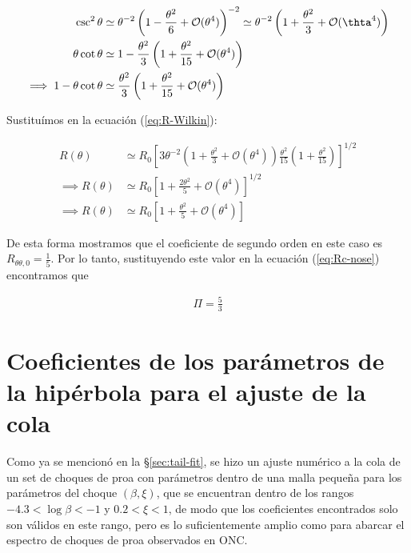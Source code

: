 \begin{align}
  \csc^2\theta &\simeq \theta^{-2}\left(1 - \frac{\theta^2}{6} + \mathcal{O}(\theta^4)\right)^{-2} \simeq
                 \theta^{-2}\left(1 + \frac{\theta^2}{3} + \mathcal{O}(\thta^4)\right) \\
  \theta\cot\theta &\simeq 1 - \frac{\theta^2}{3}\left(1 + \frac{\theta^2}{15} + \mathcal{O}(\theta^4)\right) \\
  \implies 1 -\theta\cot\theta &\simeq \frac{\theta^2}{3}\left(1 + \frac{\theta^2}{15} + \mathcal{O}(\theta^4)\right)
\end{align}

Sustituímos en la ecuación (\ref{eq:R-Wilkin}):

\begin{align}
  R(\theta) &\simeq R_0\left[3\theta^{-2}\left(1 + \frac{\theta^2}{3}+\mathcal{O}(\theta^4)\right)\frac{\theta^2}{15}
  \left(1 + \frac{\theta^2}{15}\right) \right]^{1/2} \\
  \implies R(\theta) &\simeq R_0\left[1 + \frac{2\theta^2}{5} + \mathcal{O}(\theta^4)\right]^{1/2} \\
  \implies R(\theta) &\simeq R_0\left[1 + \frac{\theta^2}{5} + \mathcal{O}(\theta^4)\right]
\end{align}

De esta forma mostramos que el coeficiente de segundo orden en este caso es $R_{\theta \theta, 0} = \frac{1}{5}$. Por lo tanto,
sustituyendo este valor en la ecuación (\ref{eq:Rc-nose}) encontramos que

\begin{align}
  \Pi = \frac{5}{3}
\end{align}

\chapter{Coeficientes de los parámetros de la hipérbola para el ajuste de la cola}
\label{app:tail-fit}
Como ya se mencionó en la \S \ref{sec:tail-fit}, se hizo un ajuste numérico a
la cola de un set de choques de proa con parámetros dentro de una malla pequeña para los parámetros del choque $(\beta, \xi)$, que se encuentran dentro de los rangos $-4.3 < \log\beta < -1$ y $0.2 < \xi < 1$, de modo que los coeficientes encontrados solo son válidos en este rango, pero es lo suficientemente amplio como para abarcar el espectro de choques de proa observados en ONC.

